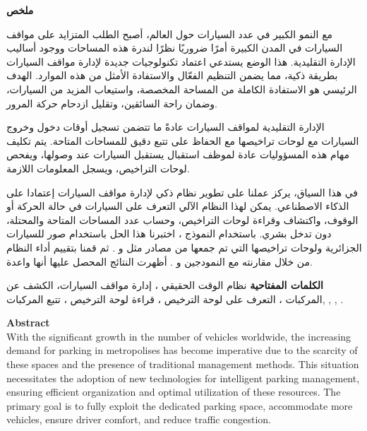 \begin{RLtext}
\par
\textbf{\Large{ملخص}}\\
\small

مع النمو الكبير في عدد السيارات حول العالم، أصبح الطلب المتزايد على مواقف السيارات في المدن الكبيرة أمرًا ضروريًا نظرًا لندرة هذه المساحات ووجود أساليب الإدارة التقليدية. هذا الوضع يستدعي اعتماد تكنولوجيات جديدة لإدارة مواقف السيارات بطريقة ذكية، مما يضمن التنظيم الفعّال والاستفادة الأمثل من هذه الموارد. الهدف الرئيسي هو الاستفادة الكاملة من المساحة المخصصة، واستيعاب المزيد من السيارات، وضمان راحة السائقين، وتقليل ازدحام حركة المرور.

\par
الإدارة التقليدية لمواقف السيارات عادةً ما تتضمن تسجيل أوقات دخول وخروج السيارات مع لوحات تراخيصها مع الحفاظ على تتبع دقيق للمساحات المتاحة. يتم تكليف مهام هذه المسؤوليات عادة لموظف استقبال يستقبل 
السيارات عند وصولها، ويفحص لوحات التراخيص، ويسجل المعلومات اللازمة.


\par
في هذا السياق، يركز عملنا على تطوير نظام ذكي لإدارة مواقف السيارات إعتمادا على الذكاء الاصطناعي. يمكن لهذا النظام الآلي التعرف على السيارات في حالة الحركة أو الوقوف، واكتشاف وقراءة لوحات التراخيص، وحساب عدد  المساحات المتاحة والمحتلة، دون تدخل بشري. باستخدام النموذج ، اختبرنا هذا الحل باستخدام صور للسيارات الجزائرية ولوحات تراخيصها التي تم جمعها من مصادر مثل   و .  ثم قمنا بتقييم أداء النظام من خلال مقارنته مع  النمودجين  و . أظهرت النتائج المحصل عليها أنها واعدة.


\textbf{الكلمات المفتاحية \LR{:}} 
 نظام الوقت الحقيقي ، إدارة مواقف السيارات، الكشف عن المركبات ، التعرف على لوحة الترخيص ، قراءة لوحة الترخيص ،  تتبع المركبات,  ,  ,  .
\end{RLtext}



\vspace{0.5cm}

\par
\textbf{\Large{Abstract}}\\

With the significant growth in the number of vehicles worldwide, the increasing demand for parking in metropolises has become imperative due to the scarcity of these spaces and the presence of traditional management methods. This situation necessitates the adoption of new technologies for intelligent parking management, ensuring efficient organization and optimal utilization of these resources. The primary goal is to fully exploit the dedicated parking space, accommodate more vehicles, ensure driver comfort, and reduce traffic congestion.


